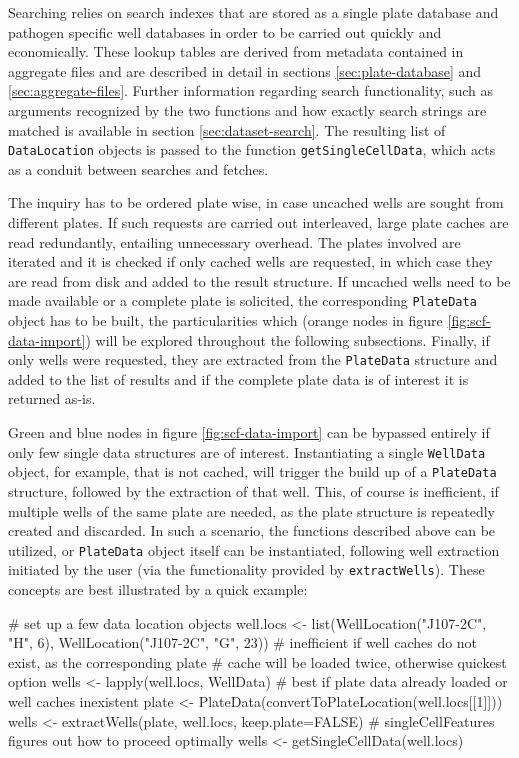 Searching relies on search indexes that are stored as a single plate database and pathogen specific well databases in order to be carried out quickly and economically. These lookup tables are derived from metadata contained in aggregate files and are described in detail in sections \ref{sec:plate-database} and \ref{sec:aggregate-files}. Further information regarding search functionality, such as arguments recognized by the two functions and how exactly search strings are matched is available in section \ref{sec:dataset-search}. The resulting list of \texttt{DataLocation} objects is passed to the function \texttt{getSingleCellData}, which acts as a conduit between searches and fetches.

The inquiry has to be ordered plate wise, in case uncached wells are sought from different plates. If such requests are carried out interleaved, large plate caches are read redundantly, entailing unnecessary overhead. The plates involved are iterated and it is checked if only cached wells are requested, in which case they are read from disk and added to the result structure. If uncached wells need to be made available or a complete plate is solicited, the corresponding \texttt{PlateData} object has to be built, the particularities which (orange nodes in figure \ref{fig:scf-data-import}) will be explored throughout the following subsections. Finally, if only wells were requested, they are extracted from the \texttt{PlateData} structure and added to the list of results and if the complete plate data is of interest it is returned as-is.

Green and blue nodes in figure \ref{fig:scf-data-import} can be bypassed entirely if only few single data structures are of interest. Instantiating a single \texttt{WellData} object, for example, that is not cached, will trigger the build up of a \texttt{PlateData} structure, followed by the extraction of that well. This, of course is inefficient, if multiple wells of the same plate are needed, as the plate structure is repeatedly created and discarded. In such a scenario, the functions described above can be utilized, or \texttt{PlateData} object itself can be instantiated, following well extraction initiated by the user (via the functionality provided by \texttt{extractWells}). These concepts are best illustrated by a quick example:

\label{ex:dataobject-instantiation}
\begin{rflow}
# set up a few data location objects
well.locs <- list(WellLocation("J107-2C", "H", 6),
                  WellLocation("J107-2C", "G", 23))
# inefficient if well caches do not exist, as the corresponding plate
# cache will be loaded twice, otherwise quickest option
wells <- lapply(well.locs, WellData)
# best if plate data already loaded or well caches inexistent
plate <- PlateData(convertToPlateLocation(well.locs[[1]]))
wells <- extractWells(plate, well.locs, keep.plate=FALSE)
# singleCellFeatures figures out how to proceed optimally
wells <- getSingleCellData(well.locs)
\end{rflow}

